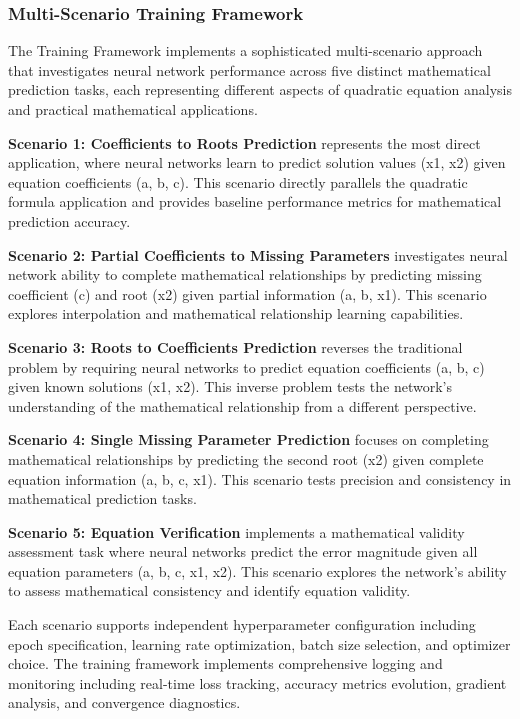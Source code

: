 \documentclass[11pt,a4paper]{report}
\begin{document}
\subsubsection{Multi-Scenario Training Framework}

The Training Framework implements a sophisticated multi-scenario approach that investigates neural network performance across five distinct mathematical prediction tasks, each representing different aspects of quadratic equation analysis and practical mathematical applications.

\textbf{Scenario 1: Coefficients to Roots Prediction} represents the most direct application, where neural networks learn to predict solution values (x1, x2) given equation coefficients (a, b, c). This scenario directly parallels the quadratic formula application and provides baseline performance metrics for mathematical prediction accuracy.

\textbf{Scenario 2: Partial Coefficients to Missing Parameters} investigates neural network ability to complete mathematical relationships by predicting missing coefficient (c) and root (x2) given partial information (a, b, x1). This scenario explores interpolation and mathematical relationship learning capabilities.

\textbf{Scenario 3: Roots to Coefficients Prediction} reverses the traditional problem by requiring neural networks to predict equation coefficients (a, b, c) given known solutions (x1, x2). This inverse problem tests the network's understanding of the mathematical relationship from a different perspective.

\textbf{Scenario 4: Single Missing Parameter Prediction} focuses on completing mathematical relationships by predicting the second root (x2) given complete equation information (a, b, c, x1). This scenario tests precision and consistency in mathematical prediction tasks.

\textbf{Scenario 5: Equation Verification} implements a mathematical validity assessment task where neural networks predict the error magnitude given all equation parameters (a, b, c, x1, x2). This scenario explores the network's ability to assess mathematical consistency and identify equation validity.

Each scenario supports independent hyperparameter configuration including epoch specification, learning rate optimization, batch size selection, and optimizer choice. The training framework implements comprehensive logging and monitoring including real-time loss tracking, accuracy metrics evolution, gradient analysis, and convergence diagnostics.
\end{document}
